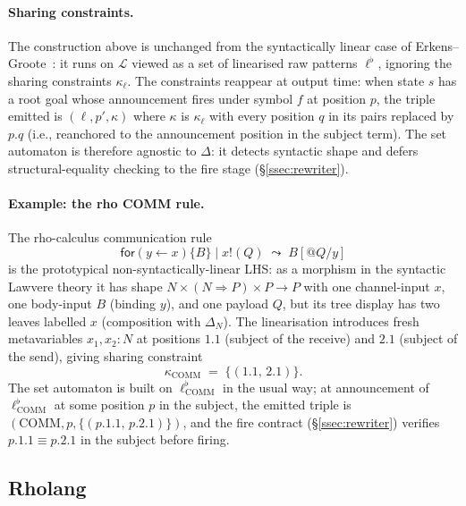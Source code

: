 \documentclass[11pt]{article}
\theoremstyle{plain}
\theoremstyle{definition}
\theoremstyle{remark}
\newcommand{\rew}{\leadsto}
\newcommand{\Lhs}{\mathcal{L}}
\begin{document}
\paragraph{Sharing constraints.}
The construction above is unchanged from the syntactically linear case
of Erkens--Groote~\cite{ErkensGroote2021}: it runs on $\Lhs$ viewed as
a set of linearised raw patterns $\ell^{\flat}$, ignoring the sharing
constraints $\kappa_{\ell}$. The constraints reappear at output time:
when state $s$ has a root goal whose announcement fires under symbol
$f$ at position $p$, the triple emitted is $(\ell, p', \kappa)$ where
$\kappa$ is $\kappa_{\ell}$ with every position $q$ in its pairs
replaced by $p.q$ (i.e., reanchored to the announcement position in the
subject term). The set automaton is therefore agnostic to $\Delta$: it
detects syntactic shape and defers structural-equality checking to the
fire stage (\S\ref{ssec:rewriter}).

\paragraph{Example: the rho COMM rule.}
The rho-calculus communication rule
\[
  \mathsf{for}(y \!\leftarrow\! x)\{B\} \mid x!(Q)
    \;\rew\; B[@Q / y]
\]
is the prototypical non-syntactically-linear LHS: as a morphism in the
syntactic Lawvere theory it has shape $N \times (N \Rightarrow P) \times P \to P$
with one channel-input $x$, one body-input $B$ (binding $y$), and one
payload $Q$, but its tree display has two leaves labelled $x$
(composition with $\Delta_N$). The linearisation introduces fresh
metavariables $x_1, x_2 : N$ at positions $1.1$ (subject of the
receive) and $2.1$ (subject of the send), giving sharing constraint
\[
  \kappa_{\mathrm{COMM}} \;=\; \{(1.1,\, 2.1)\}.
\]
The set automaton is built on $\ell^{\flat}_{\mathrm{COMM}}$ in the
usual way; at announcement of $\ell^{\flat}_{\mathrm{COMM}}$ at some
position $p$ in the subject, the emitted triple is
$(\mathrm{COMM}, p, \{(p.1.1,\, p.2.1)\})$, and the fire contract
(\S\ref{ssec:rewriter}) verifies $p.1.1 \equiv p.2.1$ in the subject
before firing.

\subsection{Rholang}\label{ssec:rholang}
\end{document}
